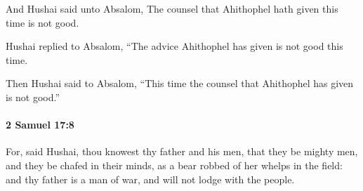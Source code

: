 			\begin{versebox}
					\item[BHS] 
					\item[ASV] And Hushai said unto Absalom, The counsel that Ahithophel hath given this time is not good.
					\item[NIV] Hushai replied to Absalom, “The advice Ahithophel has given is not good this time.
					\item[NRSV] Then Hushai said to Absalom, “This time the counsel that Ahithophel has given is not good.”
			\end{versebox}

		\paragraph{2 Samuel 17:8} %
			\label{2SAMUEL-17-8}

			For, said Hushai, thou knowest thy father and his men, that they be mighty men, and they be chafed in their minds, as a bear robbed of her whelps in the field: and thy father is a man of war, and will not lodge with the people.

